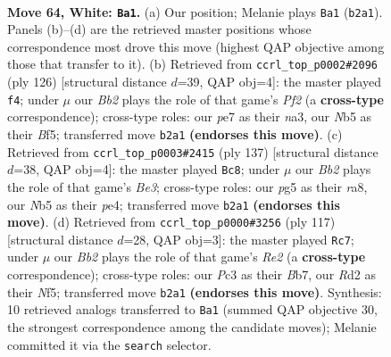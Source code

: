 \documentclass[11pt]{article}
\begin{document}
\clearpage

\begin{figure}[p]\centering
\begin{subfigure}{0.46\textwidth}\centering
\resizebox{\linewidth}{!}{%
\newchessgame
\chessboard[
  setfen={8/4p1k1/npr5/pN4p1/P1p5/2P3K1/1B1R4/8 w - - 8 64},
  showmover=false,
  pgfstyle=straightmove, color=movearrow, markmove={b2-a1}
]}
\caption{}
\end{subfigure}\hfill
\begin{subfigure}{0.46\textwidth}\centering
\resizebox{\linewidth}{!}{%
\newchessgame
\chessboard[
  setfen={1R6/8/3r1p2/k1p2Bp1/6P1/n3P3/5P2/4K3 w - - 10 64},
  showmover=false,
  pgfstyle=straightmove, color=movearrow, markmove={f2-f4}
]}
\caption{}
\end{subfigure}
\\[4pt]
\begin{subfigure}{0.46\textwidth}\centering
\resizebox{\linewidth}{!}{%
\newchessgame
\chessboard[
  setfen={R7/6k1/2r1bpp1/7p/4P2P/B4P2/6PK/8 b - - 63 69},
  showmover=false,
  pgfstyle=straightmove, color=movearrow, markmove={e6-c8}
]}
\caption{}
\end{subfigure}\hfill
\begin{subfigure}{0.46\textwidth}\centering
\resizebox{\linewidth}{!}{%
\newchessgame
\chessboard[
  setfen={3R4/1b2r3/p7/2P2nk1/RP4p1/2K4p/P4P1P/8 b - - 5 59},
  showmover=false,
  pgfstyle=straightmove, color=movearrow, markmove={e7-c7}
]}
\caption{}
\end{subfigure}
\caption{\textbf{Move 64, White: \texttt{Ba1}.} (a) Our position; Melanie plays \texttt{Ba1} (\texttt{b2a1}). Panels (b)--(d) are the retrieved master positions whose correspondence most drove this move (highest QAP objective among those that transfer to it). (b) Retrieved from \texttt{ccrl\_top\_p0002\#2096} (ply 126) [structural distance $d$=39, QAP obj=4]: the master played \texttt{f4}; under $\mu$ our \emph{Bb2} plays the role of that game's \emph{Pf2} (a \textbf{cross-type} correspondence); cross-type roles: our \emph{p}e7 as their \emph{n}a3, our \emph{N}b5 as their \emph{B}f5; transferred move \texttt{b2a1} \textbf{(endorses this move)}. (c) Retrieved from \texttt{ccrl\_top\_p0003\#2415} (ply 137) [structural distance $d$=38, QAP obj=4]: the master played \texttt{Bc8}; under $\mu$ our \emph{Bb2} plays the role of that game's \emph{Be3}; cross-type roles: our \emph{p}g5 as their \emph{r}a8, our \emph{N}b5 as their \emph{p}e4; transferred move \texttt{b2a1} \textbf{(endorses this move)}. (d) Retrieved from \texttt{ccrl\_top\_p0000\#3256} (ply 117) [structural distance $d$=28, QAP obj=3]: the master played \texttt{Rc7}; under $\mu$ our \emph{Bb2} plays the role of that game's \emph{Re2} (a \textbf{cross-type} correspondence); cross-type roles: our \emph{P}c3 as their \emph{B}b7, our \emph{R}d2 as their \emph{N}f5; transferred move \texttt{b2a1} \textbf{(endorses this move)}. Synthesis: 10 retrieved analogs transferred to \texttt{Ba1} (summed QAP objective 30, the strongest correspondence among the candidate moves); Melanie committed it via the \texttt{search} selector.}
\label{fig:thought-m126}
\end{figure}
\end{document}
